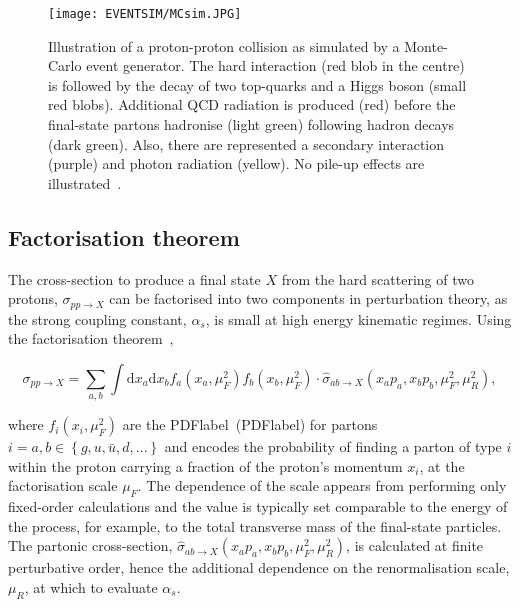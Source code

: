 \begin{figure}[htbp]
    \RawFloats
    \begin{center}
    \texttt{[image: EVENTSIM/MCsim.JPG]}
    \caption{
        Illustration of a proton-proton collision as simulated by a Monte-Carlo event generator. The hard interaction (red blob in the centre) is followed by the decay of two top-quarks and a Higgs boson (small red blobs). Additional QCD radiation is produced (red) before the final-state partons hadronise (light green) following hadron decays (dark green). Also, there are represented a secondary interaction (purple) and photon radiation (yellow). No pile-up effects are illustrated~\cite{Gleisberg_2009}. 
    }
    \label{figEVNTSIM:MCsim}
    \end{center}
\end{figure}

\clearpage

\subsection{Factorisation theorem}

The cross-section to produce a final state $X$ from the hard scattering of two protons, $\sigma_{pp\to X}$ can be factorised into two components in perturbation theory, as the strong coupling constant, $\alpha_s$, is small at high energy kinematic regimes. Using the factorisation theorem~\cite{Factorisation},

\begin{equation}
    \sigma_{pp\to X}=\sum_{a,b}\int \text{d}x_a\text{d}x_b f_a(x_a,\mu_F^2)f_b(x_b,\mu_F^2)\cdot\hat{\sigma}_{ab\to X}(x_a p_a,x_b p_b,\mu_F^2,\mu_R^2),
\end{equation}

where $f_i(x_i,\mu_F^2)$ are the \acrlong{PDFlabel}~(\acrshort{PDFlabel}) for partons $i=a,b\in\left\{g, u, \bar{u}, d, ...\right\}$ and encodes the probability of finding a parton of type $i$ within the proton carrying a fraction of the proton's momentum $x_i$, at the factorisation scale $\mu_F$. The dependence of the scale appears from performing only fixed-order calculations and the value is typically set comparable to the energy of the process, for example, to the total transverse mass of the final-state particles. The partonic cross-section, $\hat{\sigma}_{ab\to X}(x_a p_a,x_b p_b,\mu_F^2,\mu_R^2)$, is calculated at finite perturbative order, hence the additional dependence on the renormalisation scale, $\mu_R$, at which to evaluate $\alpha_s$.


